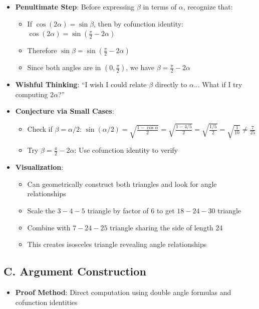 \documentclass[11pt]{article}
\begin{document}
\begin{strategicbox}
\begin{itemize}[leftmargin=*]
    \item \textbf{Penultimate Step}: Before expressing $\beta$ in terms of $\alpha$, recognize that:
    \begin{itemize}
        \item If $\cos(2\alpha) = \sin\beta$, then by cofunction identity: $\cos(2\alpha) = \sin\left(\frac{\pi}{2} - 2\alpha\right)$
        \item Therefore $\sin\beta = \sin\left(\frac{\pi}{2} - 2\alpha\right)$
        \item Since both angles are in $(0, \frac{\pi}{2})$, we have $\beta = \frac{\pi}{2} - 2\alpha$
    \end{itemize}
    
    \item \textbf{Wishful Thinking}: ``I wish I could relate $\beta$ directly to $\alpha$... What if I try computing $2\alpha$?''
    
    \item \textbf{Conjecture via Small Cases}: 
    \begin{itemize}
        \item Check if $\beta = \alpha/2$: $\sin(\alpha/2) = \sqrt{\frac{1-\cos\alpha}{2}} = \sqrt{\frac{1-4/5}{2}} = \sqrt{\frac{1/5}{2}} = \sqrt{\frac{1}{10}} \neq \frac{7}{25}$ \texttimes
        \item Try $\beta = \frac{\pi}{2} - 2\alpha$: Use cofunction identity to verify \checkmark
    \end{itemize}
    
    \item \textbf{Visualization}: 
    \begin{itemize}
        \item Can geometrically construct both triangles and look for angle relationships
        \item Scale the $3{-}4{-}5$ triangle by factor of 6 to get $18{-}24{-}30$ triangle
        \item Combine with $7{-}24{-}25$ triangle sharing the side of length 24
        \item This creates isosceles triangle revealing angle relationships
    \end{itemize}
\end{itemize}

\subsection*{C. Argument Construction}
\begin{itemize}[leftmargin=*]
    \item \textbf{Proof Method}: Direct computation using double angle formulas and cofunction identities
    

\end{itemize}
\end{strategicbox}
\end{document}
